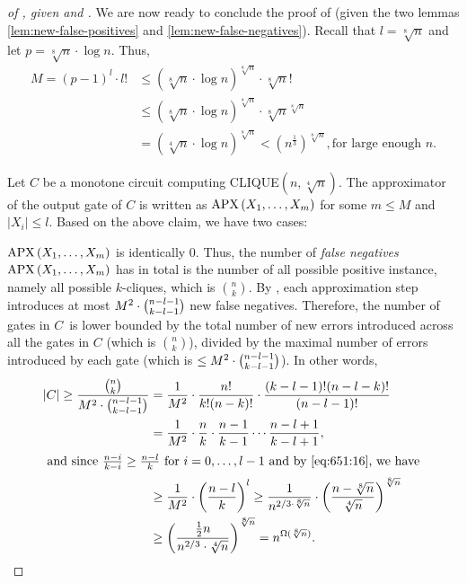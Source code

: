 \begin{proof}[of , given   and ]
We are now ready to conclude the proof of  (given the two lemmas \ref{lem:new-false-positives} and \ref{lem:new-false-negatives}).
Recall that $l=\sqrt[8]{n}$ and
let $p=\sqrt[8]{n} \cdot \log n$. 
Thus, 
\begin{equation}
\label{eq:651:16}
\begin{aligned}
M  = 
(p-1)^l \cdot l!
& \leq (\sqrt[8]{n} \cdot \log n)^{\sqrt[8]{n}} \cdot \sqrt[8]{n}! \\
& \leq (\sqrt[8]{n} \cdot \log n)^{\sqrt[8]{n}}
\cdot \sqrt[8]{n}^{\sqrt[8]{n}} \\
& =(\sqrt[4]{n} \cdot \log n)^{\sqrt[8]{n}}<
\left(n^{\frac{1}{3}}\right)^{\sqrt[8]{n}}, \text{
for large enough $n$.}
\end{aligned}
\end{equation}


Let $C$ be a monotone circuit computing CLIQUE$(n, \sqrt[4]{n})$.
%
%
%
The approximator of the output gate of $C$ is written as  $\operatorname{\mathrm{APX}}\left(X_1, \ldots, X_m\right)$ for some $m \leq M$ and $\left|X_i\right| \leq l$.
Based on the above claim, we have two cases:
\medskip 

\noindent {} $\operatorname{\mathrm{APX}}\left(X_1, \ldots, X_m\right) $ is identically 0. 
Thus, the number of \emph{false negatives} $\operatorname{\mathrm{APX}}\left(X_1, \ldots, X_m\right)$ has in total is the number of all possible positive instance, namely all possible $k$-cliques, which is $\binom{n}{k}$.
By ,  each approximation step introduces at most $M^2\cdot\binom{n-l-1}{k-l-1}$ new false negatives. Therefore,  the number of gates in  $C$\ is lower bounded by the total number of new errors introduced across all the  gates in $C$ (which is $\binom{n}{k}$), divided by the maximal number of errors introduced by each gate (which is $\le M^2\cdot\binom{n-l-1}{k-l-1}$). In other words,
\begin{align*}
|C| \geq \frac{\binom{n}{k}}{M^2\cd\binom{n-l-1}{k-l-1}}
& = \frac{1}{M^2}\cd\frac{n!}{k!(n-k)!} \cdot \frac{(k-l-1)!(n-l-k)!}{(n-l-1)!} \\
& = \frac{1}{M^2}\cd \frac{n}{k} \cdot \frac{n-1}{k-1} \cdots \frac{n-l+1}{k-l+1},
\\
\intertext{
and since $\frac{n-i}{k-i} \geq \frac{n-l}{k}$
for $i=0,\dots,l-1$ and by \Cref{eq:651:16}, we have 
}
 & \geq \frac{1}{M^2}
 \cd\left(\frac{n-l}{k}\right)^l \geq
  \frac{1}{n^{2/3\cd\sqrt[8]{n}}}\cd
  \left(\frac{n-\sqrt[8]{n}}{\sqrt[4]{n}}\right)^{\sqrt[8]{n}} \\
& \ge
  \left(\frac{\frac{1}{2}n}{{n^{2/3}}\cd\sqrt[4]{n}}\right)^{\sqrt[8]{n}}
=
  n^{\Omega(\sqrt[8]{n})}.
\end{align*}



\end{proof}
